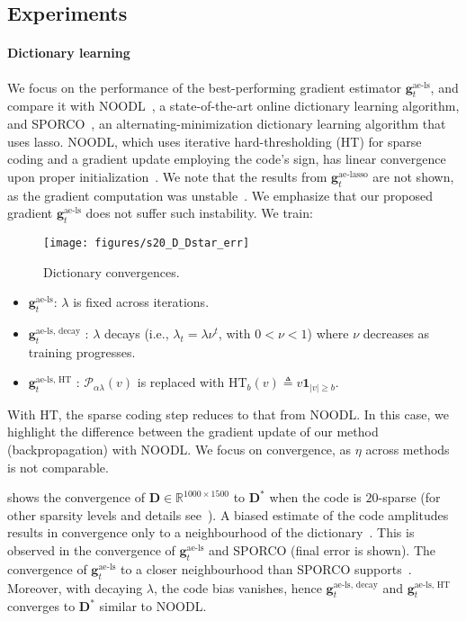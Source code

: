 \documentclass[10pt]{article} %
\newcommand{\R}{\mathbb{R}} %
\newcommand{\D}{{\bm D}}
\newcommand{\g}{{\bm g}}
\newcommand{\prox}{\mathcal{P}}
\begin{document}
\subsection{Experiments}\label{sec:exp}
%
\paragraph{Dictionary learning} We focus on the performance of the best-performing gradient estimator $\g_t^{\text{ae-ls}}$, and compare it with NOODL~\citep{rambhatla2018noodl}, a state-of-the-art online dictionary learning algorithm, and SPORCO~\citep{wohlberg2017sporco}, an alternating-minimization dictionary learning algorithm that uses lasso. NOODL, which uses iterative hard-thresholding (HT) for sparse coding and a gradient update employing the code's sign, has linear convergence upon proper initialization~\citep{rambhatla2018noodl}. We note that the results from $\g_t^{\text{ae-lasso}}$ are not shown, as the gradient computation was unstable~\citep{malezieux2022understanding}. We emphasize that our proposed gradient $\g_t^{\text{ae-ls}}$ does not suffer such instability. We train:
%
%
\begin{wrapfigure}[14]{r}{0.41\textwidth}
	\centering
	\texttt{[image: figures/s20\_D\_Dstar\_err]}
	\caption{Dictionary convergences.}
	\label{fig:baslines}
\end{wrapfigure}
% 
 \begin{itemize}[noitemsep, topsep=0pt, leftmargin=12pt]
 \item $\g_t^{\text{ae-ls}}$: $\lambda$ is fixed across iterations.
 \item $\g_t^{\text{ae-ls, decay}}$ : $\lambda$ decays (i.e., $\lambda_t = \lambda \nu^t$, with $0 <\nu < 1$) where $\nu$ decreases as training progresses.
 \item $\g_t^{\text{ae-ls, HT}}$ : $\prox_{\alpha \lambda}(v)$ is replaced with $\text{HT}_{b}(v) \triangleq v \bm{1}_{|v| \geq b}$.
 \end{itemize}
With $\text{HT}$, the sparse coding step reduces to that from NOODL. In this case, we highlight the difference between the gradient update of our method (backpropagation) with NOODL. We focus on convergence, as $\eta$ across methods is not comparable.

 shows the convergence of $\D\!\in\!\R^{1000 \times 1500}$ to $\D^{\ast}$ when the code is $20$-sparse (for other sparsity levels and details see~). A biased estimate of the code amplitudes results in convergence only to a neighbourhood of the dictionary~\citep{rambhatla2018noodl}. This is observed in the convergence of $\g_t^{\text{ae-ls}}$ and SPORCO (final error is shown). The convergence of $\g_t^{\text{ae-ls}}$ to a closer neighbourhood than SPORCO supports~. Moreover, with decaying $\lambda$, the code bias vanishes, hence $\g_t^{\text{ae-ls, decay}}$ and $\g_t^{\text{ae-ls, HT}}$ converges to $\D^{\ast}$ similar to NOODL.
\end{document}
